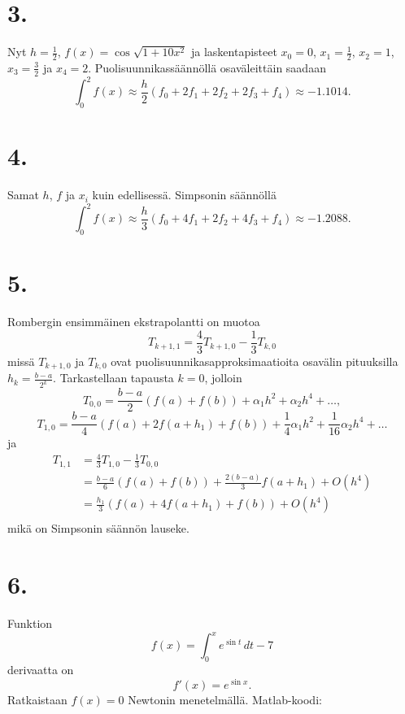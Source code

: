 \documentclass{article}
\begin{document}
\section*{3.}

Nyt $h = \frac{1}{2}$, $f(x) = \cos\sqrt{1+10x^2}$ ja laskentapisteet
$x_0 = 0$, $x_1 = \frac{1}{2}$, $x_2 = 1$, $x_3 = \frac{3}{2}$ ja $x_4 = 2$.
Puolisuunnikassäännöllä osaväleittäin saadaan
\[
  \int_0^2 f(x) \approx \frac{h}{2}(f_0 + 2f_1 + 2f_2 + 2f_3 + f_4)
  \approx -1.1014.
\]


\section*{4.}

Samat $h$, $f$ ja $x_i$ kuin edellisessä.
Simpsonin säännöllä
\[
  \int_0^2 f(x) \approx \frac{h}{3}(f_0 + 4f_1 + 2f_2 + 4f_3 + f_4)
  \approx -1.2088.
\]


\section*{5.}

Rombergin ensimmäinen ekstrapolantti on muotoa
\[
  T_{k+1,1} = \frac{4}{3}T_{k+1,0} - \frac{1}{3}T_{k,0}
\]
missä $T_{k+1,0}$ ja $T_{k,0}$ ovat puolisuunnikasapproksimaatioita
osavälin pituuksilla $h_k = \frac{b-a}{2^k}$.
Tarkas\-tellaan tapausta $k=0$, jolloin
\[
  T_{0,0} = \frac{b-a}{2}(f(a) + f(b)) + \alpha_1h^2 + \alpha_2h^4 + \dots,
\]
\[
  T_{1,0} = \frac{b-a}{4}(f(a) + 2f(a+h_1) + f(b))
  + \frac{1}{4}\alpha_1h^2 + \frac{1}{16}\alpha_2h^4 + \dots
\]
ja
\begin{align*}
  T_{1,1} &= \frac{4}{3}T_{1,0} - \frac{1}{3}T_{0,0} \\
          &= \frac{b-a}{6}(f(a) + f(b)) + \frac{2(b-a)}{3}f(a+h_1) + O(h^4) \\
          &= \frac{h_1}{3}(f(a) + 4f(a+h_1) + f(b)) + O(h^4) \\
\end{align*}
mikä on Simpsonin säännön lauseke.


\section*{6.}

Funktion 
\[
  f(x) = \int_0^x e^{\sin t}\,dt - 7
\]
derivaatta on
\[
  f'(x) = e^{\sin x}.
\]
Ratkaistaan $f(x) = 0$ Newtonin menetelmällä.
Matlab-koodi:


\end{document}
